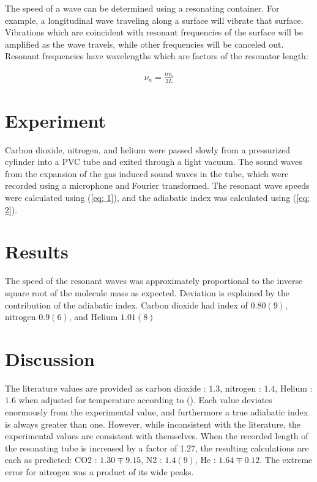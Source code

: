 \documentclass{article}
\begin{document}
The speed of a wave can be determined using a resonating container.
 For example, a longitudinal wave traveling along a surface will vibrate that surface.
  Vibrations which are coincident with resonant frequencies of the surface will be amplified as the wave travels, while other frequencies will be canceled out.  Resonant frequencies have wavelengths which are factors of the resonator length:

\begin{align}
    \nu_n = \frac{nv_s}{2L} \label{eq: 2}
\end{align}

\section{Experiment}\label{sec:experiment}

Carbon dioxide, nitrogen, and helium were passed slowly from a pressurized cylinder into a PVC tube and exited through a light vacuum.  The sound waves from the expansion of the gas induced sound waves in the tube, which were recorded using a microphone and Fourier transformed.  The resonant wave speeds were calculated using (\ref{eq: 1}), and the adiabatic index was calculated using (\ref{eq: 2}).

\section{Results}\label{sec:results}

The speed of the resonant waves was approximately proportional to the inverse square root of the molecule mass as expected.  Deviation is explained by the contribution of the adiabatic index.  Carbon dioxide had index of $0.80(9)$, nitrogen $0.9(6)$, and Helium $1.01(8)$

\section{Discussion}\label{sec:discussion}

The literature values are provided as carbon dioxide : $1.3$, nitrogen : $1.4$, Helium : $1.6$ when adjusted for temperature according to ().  Each value deviates enormously from the experimental value, and furthermore a true adiabatic index is always greater than one.  However, while inconsistent with the literature, the experimental values are consistent with themselves.  When the recorded length of the resonating tube is increased by a factor of 1.27, the resulting calculations are each as predicted: CO2 : $1.30 \mp 9.15$, N2 : $1.4 (9)$, He : $1.64 \mp 0.12$.  The extreme error for nitrogen was a product of its wide peaks.
\end{document}
